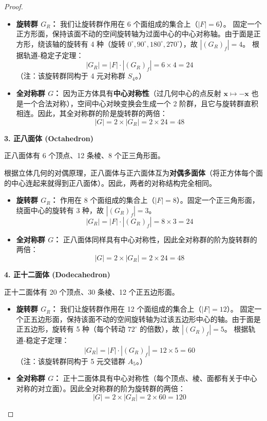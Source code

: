 \documentclass[]{article}
\begin{document}
\begin{proof}
\begin{itemize}
	\item \textbf{旋转群 $G_R$：}
	我们让旋转群作用在 6 个面组成的集合上（$|F| = 6$）。
	固定一个正方形面，保持该面不动的空间旋转轴为过面中心的中心对称轴。由于面是正方形，绕该轴的旋转有 4 种（旋转 $0^\circ, 90^\circ, 180^\circ, 270^\circ$），故 $|(G_R)_f| = 4$。
	根据轨道-稳定子定理：
	\[ |G_R| = |F| \cdot |(G_R)_f| = 6 \times 4 = 24 \]
	（注：该旋转群同构于 4 元对称群 $S_4$。）
	
	\item \textbf{全对称群 $G$：}
	因为正方体具有\textbf{中心对称性}（过几何中心的点反射 $\mathbf{x} \mapsto -\mathbf{x}$ 也是一个合法对称），空间中心对映变换会生成一个 2 阶群，且它与旋转群直积相连。因此，其全对称群的阶是旋转群的两倍：
	\[ |G| = 2 \times |G_R| = 2 \times 24 = 48 \]
\end{itemize}

\bigskip
\noindent \textbf{3. 正八面体 (Octahedron)}

正八面体有 6 个顶点、12 条棱、8 个正三角形面。

根据立体几何的对偶原理，正八面体与正六面体互为\textbf{对偶多面体}（将正方体每个面的中心连起来就得到正八面体）。因此，两者的对称结构完全相同。
\begin{itemize}
	\item \textbf{旋转群 $G_R$：}
	作用在 8 个面组成的集合上（$|F| = 8$）。固定一个正三角形面，绕面中心的旋转有 3 种，故 $|(G_R)_f| = 3$。
	\[ |G_R| = |F| \cdot |(G_R)_f| = 8 \times 3 = 24 \]
	
	\item \textbf{全对称群 $G$：}
	正八面体同样具有中心对称性，因此全对称群的阶为旋转群的两倍：
	\[ |G| = 2 \times |G_R| = 2 \times 24 = 48 \]
\end{itemize}

\bigskip
\noindent \textbf{4. 正十二面体 (Dodecahedron)}

正十二面体有 20 个顶点、30 条棱、12 个正五边形面。

\begin{itemize}
	\item \textbf{旋转群 $G_R$：}
	我们让旋转群作用在 12 个面组成的集合上（$|F| = 12$）。
	固定一个正五边形面，保持该面不动的空间旋转轴为过该五边形中心的轴。由于面是正五边形，旋转有 5 种（每个转动 $72^\circ$ 的倍数），故 $|(G_R)_f| = 5$。
	根据轨道-稳定子定理：
	\[ |G_R| = |F| \cdot |(G_R)_f| = 12 \times 5 = 60 \]
	（注：该旋转群同构于 5 元交错群 $A_5$。）
	
	\item \textbf{全对称群 $G$：}
	正十二面体具有中心对称性（每个顶点、棱、面都有关于中心对称的对立面）。因此全对称群的阶为旋转群的两倍：
	\[ |G| = 2 \times |G_R| = 2 \times 60 = 120 \]
\end{itemize}


\end{proof}
\end{document}
